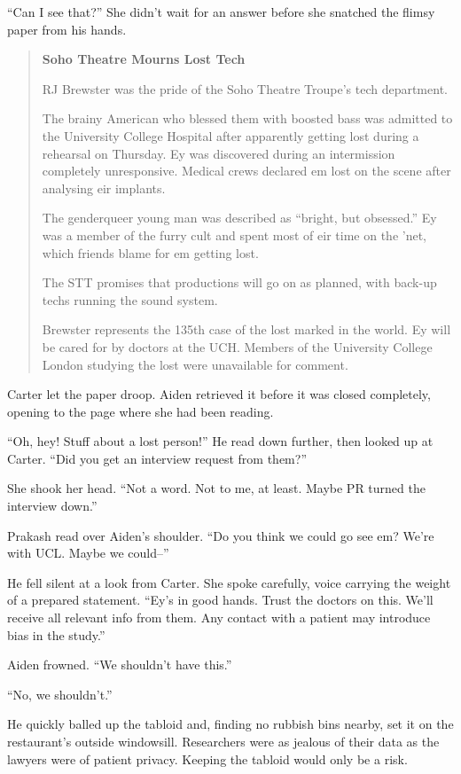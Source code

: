 ``Can I see that?'' She didn't wait for an answer before she snatched the flimsy paper from his hands.

\begin{quote}
\textbf{Soho Theatre Mourns Lost Tech}

RJ Brewster was the pride of the Soho Theatre Troupe's tech department.

The brainy American who blessed them with boosted bass was admitted to the University College Hospital after apparently getting lost during a rehearsal on Thursday. Ey was discovered during an intermission completely unresponsive. Medical crews declared em lost on the scene after analysing eir implants.

The genderqueer young man was described as ``bright, but obsessed.'' Ey was a member of the furry cult and spent most of eir time on the 'net, which friends blame for em getting lost.

The STT promises that productions will go on as planned, with back-up techs running the sound system.

Brewster represents the 135th case of the lost marked in the world. Ey will be cared for by doctors at the UCH. Members of the University College London studying the lost were unavailable for comment.
\end{quote}

Carter let the paper droop. Aiden retrieved it before it was closed completely, opening to the page where she had been reading.

``Oh, hey! Stuff about a lost person!'' He read down further, then looked up at Carter. ``Did you get an interview request from them?''

She shook her head. ``Not a word. Not to me, at least. Maybe PR turned the interview down.''

Prakash read over Aiden's shoulder. ``Do you think we could go see em? We're with UCL. Maybe we could--''

He fell silent at a look from Carter. She spoke carefully, voice carrying the weight of a prepared statement. ``Ey's in good hands. Trust the doctors on this. We'll receive all relevant info from them. Any contact with a patient may introduce bias in the study.''

Aiden frowned. ``We shouldn't have this.''

``No, we shouldn't.''

He quickly balled up the tabloid and, finding no rubbish bins nearby, set it on the restaurant's outside windowsill. Researchers were as jealous of their data as the lawyers were of patient privacy. Keeping the tabloid would only be a risk.

